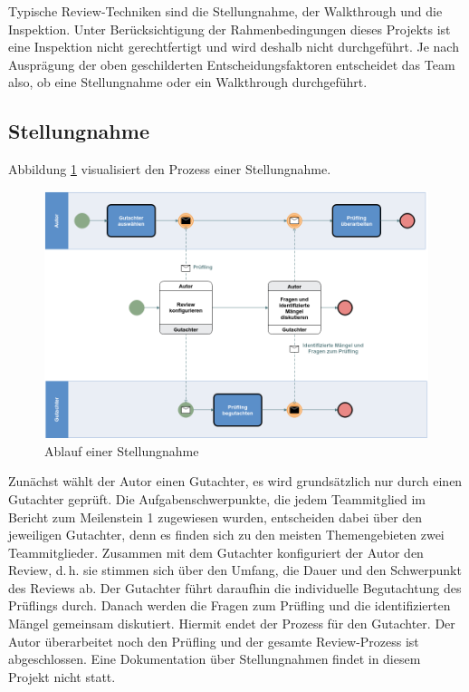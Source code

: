 \documentclass[a4paper,11pt,listof=numbered,glossary=totoc,parskip=half,toc=bib]{scrreprt}
\newcommand{\dash}{\mbox{d.\,h.}\xspace}
\begin{document}
Typische Review-Techniken sind die Stellungnahme, der Walkthrough und die Inspektion. Unter Berücksichtigung der Rahmenbedingungen dieses Projekts ist eine Inspektion nicht gerechtfertigt und wird deshalb nicht durchgeführt. Je nach Ausprägung der oben geschilderten Entscheidungsfaktoren entscheidet das Team also, ob eine Stellungnahme oder ein Walkthrough durchgeführt.

\subsection{Stellungnahme}
Abbildung \ref{fig:stellungnahme} visualisiert den Prozess einer Stellungnahme. 
	\begin{figure}
		\centering
		\includegraphics[width=\textwidth]{stellungnahme.png}
		\caption{Ablauf einer Stellungnahme}
		\label{fig:stellungnahme}
	\end{figure}
Zunächst wählt der Autor einen Gutachter, es wird grundsätzlich nur durch einen Gutachter geprüft. Die Aufgabenschwerpunkte, die jedem Teammitglied im Bericht zum Meilenstein 1 zugewiesen wurden, entscheiden dabei über den jeweiligen Gutachter, denn es finden sich zu den meisten Themengebieten zwei Teammitglieder. Zusammen mit dem Gutachter konfiguriert der Autor den Review, \dash sie stimmen sich über den Umfang, die Dauer und den Schwerpunkt des Reviews ab. Der Gutachter führt daraufhin die individuelle Begutachtung des Prüflings durch. Danach werden die Fragen zum Prüfling und die identifizierten Mängel gemeinsam diskutiert. Hiermit endet der Prozess für den Gutachter. Der Autor überarbeitet noch den Prüfling und der gesamte Review-Prozess ist abgeschlossen. Eine Dokumentation über Stellungnahmen findet in diesem Projekt nicht statt.
\end{document}
